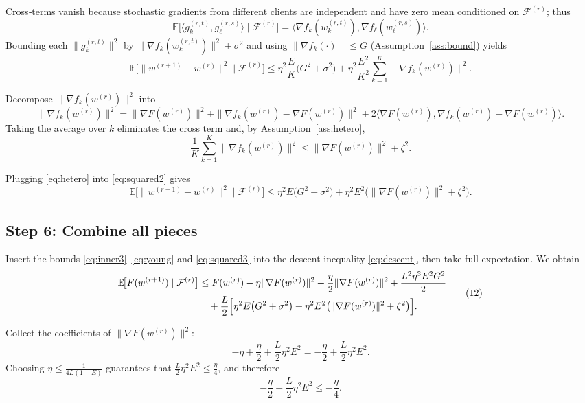 \documentclass{article}
\newcommand{\E}{\mathbb{E}}
\begin{document}
Cross‑terms vanish because stochastic gradients from different clients are
independent and have zero mean conditioned on $\mathcal{F}^{(r)}$; thus
\[
\E\!\bigl[\langle g_{k}^{(r,t)},g_{\ell}^{(r,s)}\rangle\mid\mathcal{F}^{(r)}\bigr]
= \langle\nabla f_k(w_{k}^{(r,t)}),\nabla f_\ell(w_{\ell}^{(r,s)})\rangle .
\]
Bounding each $\|g_{k}^{(r,t)}\|^2$ by $\|\nabla f_k(w_{k}^{(r,t)})\|^2+\sigma^2$ and using
$\|\nabla f_k(\cdot)\|\le G$ (Assumption~\ref{ass:bound}) yields
\[
\E\!\bigl[\|w^{(r+1)}-w^{(r)}\|^2\mid\mathcal{F}^{(r)}\bigr]
\le \eta^2\frac{E}{K}\bigl(G^2+\sigma^2\bigr)
   +\eta^2\frac{E^2}{K^2}\sum_{k=1}^{K}\|\nabla f_k(w^{(r)})\|^2 .
\tag{9}
\label{eq:squared2}
\]

Decompose $\|\nabla f_k(w^{(r)})\|^2$ into
\[
\|\nabla f_k(w^{(r)})\|^2
= \|\nabla F(w^{(r)})\|^2
  +\|\nabla f_k(w^{(r)})-\nabla F(w^{(r)})\|^2
  +2\langle\nabla F(w^{(r)}),\nabla f_k(w^{(r)})-\nabla F(w^{(r)})\rangle .
\]
Taking the average over $k$ eliminates the cross term and,
by Assumption~\ref{ass:hetero},
\[
\frac{1}{K}\sum_{k=1}^{K}\|\nabla f_k(w^{(r)})\|^2
\le \|\nabla F(w^{(r)})\|^2 + \zeta^2 .
\tag{10}
\label{eq:hetero}
\]

Plugging \eqref{eq:hetero} into \eqref{eq:squared2} gives
\[
\E\!\bigl[\|w^{(r+1)}-w^{(r)}\|^2\mid\mathcal{F}^{(r)}\bigr]
\le \eta^2E\bigl(G^2+\sigma^2\bigr)
   +\eta^2E^2\bigl(\|\nabla F(w^{(r)})\|^2+\zeta^2\bigr) .
\tag{11}
\label{eq:squared3}
\]

\subsection*{Step 6: Combine all pieces}
Insert the bounds \eqref{eq:inner3}–\eqref{eq:young} and \eqref{eq:squared3}
into the descent inequality \eqref{eq:descent}, then take full expectation.
We obtain
\[
\begin{aligned}
\E\!\bigl[F(w^{(r+1)})\mid\mathcal{F}^{(r)}\bigr]
&\le F(w^{(r)})
   -\eta\|\nabla F(w^{(r)})\|^2
   +\frac{\eta}{2}\|\nabla F(w^{(r)})\|^2
   +\frac{L^2\eta^3E^2G^2}{2}  \\
&\quad +\frac{L}{2}\Bigl[
      \eta^2E\bigl(G^2+\sigma^2\bigr)
     +\eta^2E^2\bigl(\|\nabla F(w^{(r)})\|^2+\zeta^2\bigr)
      \Bigr] .
\end{aligned}
\tag{12}
\label{eq:combined}
\]

Collect the coefficients of $\|\nabla F(w^{(r)})\|^2$:
\[
-\eta +\frac{\eta}{2}+ \frac{L}{2}\eta^2E^2
= -\frac{\eta}{2}+ \frac{L}{2}\eta^2E^2 .
\]
Choosing $\eta\le \frac{1}{4L(1+E)}$ guarantees that
$ \frac{L}{2}\eta^2E^2 \le \frac{\eta}{4}$, and therefore
\[
-\frac{\eta}{2}+ \frac{L}{2}\eta^2E^2 \le -\frac{\eta}{4}.
\tag{13}
\label{eq:coeff}
\]
\end{document}
